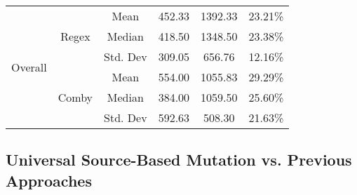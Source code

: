 \documentclass[sigconf,review, anonymous]{acmart}
\begin{document}
{\begin{table}[hbtp]
{\begin{tabular}{|c|c|c|c|c|c|}
\multirow{6}{*}{Overall} & \multirow{3}{*}{Regex} & Mean & 452.33 & 1392.33	& 23.21\%\\\cline{3-6}
    &   &  Median & 418.50 & 1348.50 & 23.38\%  \\\cline{3-6}
    &   &  Std. Dev & 309.05 & 656.76 & 12.16\%  \\\cline{2-6}

 & \multirow{3}{*}{Comby} & Mean & 554.00 & 1055.83	& 29.29\% \\\cline{3-6}
    &   &  Median & 384.00 & 1059.50	& 25.60\%  \\\cline{3-6}
    &   &  Std. Dev & 592.63 & 508.30 & 21.63\%  \\\hline


\end{tabular}

}
\end{table}



\subsection{Universal Source-Based Mutation vs. Previous Approaches}



\begin{table}[htbp]
\centering
\caption{C++ (UniversalMutator vs. Dextool)}
\label{tab:table_cpp2}
\end{table}}
\end{document}
